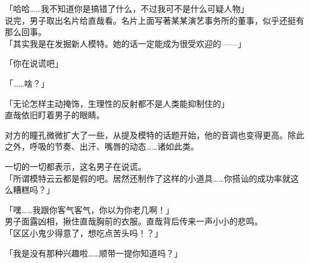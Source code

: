 「哈哈……我不知道你是搞错了什么，不过我可不是什么可疑人物」\\

说完，男子取出名片给直哉看。名片上面写著某某演艺事务所的董事，似乎还挺有那么回事。\\

「其实我是在发掘新人模特。她的话一定能成为很受欢迎的——」

「你在说谎吧」

「……啥？」

「无论怎样主动掩饰，生理性的反射都不是人类能抑制住的」\\

直哉依旧盯着男子的眼睛。

对方的瞳孔微微扩大了一些，从提及模特的话题开始，他的音调也变得更高。除此之外，呼吸的节奏、出汗、嘴唇的动态……诸如此类。

一切的一切都表示，这名男子在说谎。\\

「所谓模特云云都是假的吧。居然还制作了这样的小道具……你搭讪的成功率就这么糟糕吗？」

「嘿……我跟你客气客气，你以为你老几啊！」\\

男子面露凶相，揪住直哉胸前的衣服。直哉背后传来一声小小的悲鸣。\\

「区区小鬼少得意了，想吃点苦头吗！？」

「我是没有那种兴趣啦……顺带一提你知道吗？」

